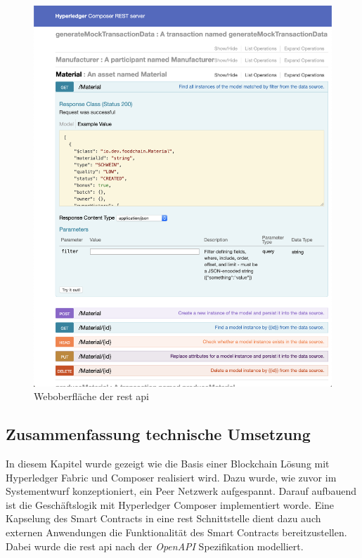 \begin{figure}[H]
	\centering
	\includegraphics[width=1\linewidth]{pictures/rest-api-explorer}
	\caption[Weboberfläche der \acs{rest} \acs{api}]{Weboberfläche der \ac{rest} \ac{api}}
	\label{fig:rest-api-explorer}
\end{figure}


\subsection{Zusammenfassung technische Umsetzung}
In diesem Kapitel wurde gezeigt wie die Basis einer Blockchain Lösung mit Hyperledger Fabric und Composer realisiert wird. Dazu wurde, wie zuvor im Systementwurf konzeptioniert, ein Peer Netzwerk aufgespannt. Darauf aufbauend ist die Geschäftslogik mit Hyperledger Composer implementiert worde. Eine Kapselung des Smart Contracts in eine \ac{rest} Schnittstelle dient dazu auch externen Anwendungen die Funktionalität des Smart Contracts bereitzustellen. Dabei wurde die \ac{rest} \ac{api} nach der \textit{OpenAPI} Spezifikation modelliert.


\newpage
